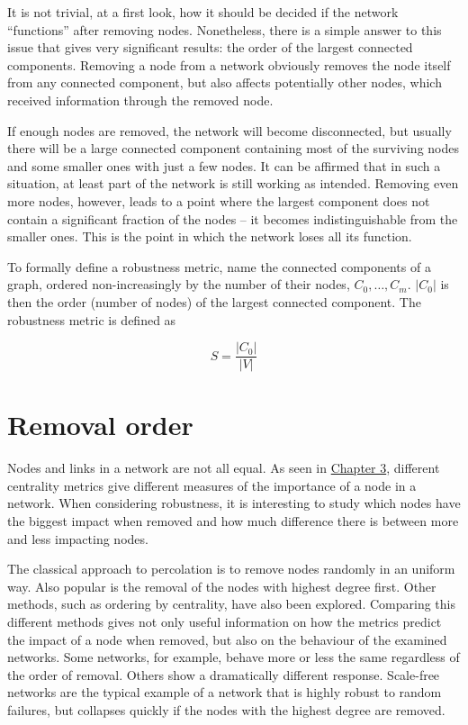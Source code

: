 \documentclass[a4paper,11pt,twoside,openright]{memoir}
\begin{document}
It is not trivial, at a first look, how it should be decided if the
network ``functions'' after removing nodes. Nonetheless, there is a
simple answer to this issue that gives very significant results: the
order of the largest connected components. Removing a node from a
network obviously removes the node itself from any connected component,
but also affects potentially other nodes, which received information
through the removed node.

If enough nodes are removed, the network will become disconnected, but
usually there will be a large connected component containing most of the
surviving nodes and some smaller ones with just a few nodes. It can be
affirmed that in such a situation, at least part of the network is still
working as intended. Removing even more nodes, however, leads to a point
where the largest component does not contain a significant fraction of
the nodes -- it becomes indistinguishable from the smaller ones. This is
the point in which the network loses all its function.

To formally define a robustness metric, name the connected components of
a graph, ordered non-increasingly by the number of their nodes,
$C_0, \ldots, C_m$. $|C_0|$ is then the order (number of nodes) of the
largest connected component. The robustness metric is defined as

\begin{equation}
S = \frac{|C_0|}{|V|}
\end{equation}

\section{Removal order}\label{removal-order}

Nodes and links in a network are not all equal. As seen in
\hyperref[network-topology-and-graphs]{Chapter 3}, different
centrality metrics give different measures of the importance of a node
in a network. When considering robustness, it is interesting to study
which nodes have the biggest impact when removed and how much difference
there is between more and less impacting nodes.

The classical approach to percolation is to remove nodes randomly in an
uniform way. Also popular is the removal of the nodes with highest
degree first. Other methods, such as ordering by centrality, have also
been explored. Comparing this different methods gives not only useful
information on how the metrics predict the impact of a node when
removed, but also on the behaviour of the examined networks. Some
networks, for example, behave more or less the same regardless of the
order of removal. Others show a dramatically different response.
Scale-free networks are the typical example of a network that is highly
robust to random failures, but collapses quickly if the nodes with the
highest degree are removed.
\end{document}
